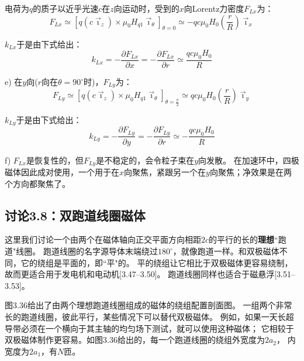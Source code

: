 电荷为$q$的质子以近乎光速$c$在$z$向运动时，受到的$x$向Lorentz力密度$F_{Lx}$为：
\begin{equation}
F_{Lx}\simeq[q(c\vec{\imath}_{z})\times\mu_{0}H_{q1}\vec{\imath}_{\theta}]_{\theta=0}
\simeq-qc\mu_{0}H_{0}\left(\frac{r}{R}\right)\vec{\imath}_{x}\tag{S9.2}%
\end{equation}

$k_{Lx}$于是由下式给出：
\begin{equation}
k_{Lx}=-\frac{\partial F_{Lx}}{\partial x}=-\frac{\partial F_{Lx}}{\partial r}
\simeq \frac{qc\mu_{0}H_{0}}{R}\tag{3.148}%
\end{equation}

e) 在$y$向($r$向在$\theta=90^\circ$时)，$F_{Ly}$为：
\begin{equation}
F_{Ly}\simeq[q(c\vec{\imath}_{z})\times\mu_{0}H_{q1}\vec{\imath}_{\theta}]_{\theta=\frac{\pi}{2}}
\simeq qc\mu_{0}H_{0}\left(\frac{r}{R}\right)\vec{\imath}_{y}\tag{S9.3}%
\end{equation}

$k_{Ly}$于是由下式给出：
\begin{equation}
k_{Ly}=-\frac{\partial F_{Ly}}{\partial y}=-\frac{\partial F_{Ly}}{\partial r}
\simeq-\frac{qc \mu_{0}H_{0}}{R}\tag{3.149}%
\end{equation}

f) $F_{Lx}$是恢复性的，但$F_{Ly}$是不稳定的，会令粒子束在$y$向发散。
在加速环中，四极磁体因此成对使用，一个用于在$x$向聚焦，紧跟另一个在$y$向聚焦；净效果是在两个方向都聚焦了。




\subsection{讨论3.8：双跑道线圈磁体}
这里我们讨论一个由两个在磁体轴向正交平面方向相距$2c$的平行的长的\textbf{理想}``跑道"线圈。
跑道线圈的名字源导体末端绕过$180^\circ$，就像跑道一样。和双极磁体不同，它的绕组是平面的，即``平"的。
平的绕组让它相比于双极磁体更容易绕制，故而更适合用于发电机和电动机[3.47–3.50]。
跑道线圈同样也适合于磁悬浮[3.51–3.53]。

图3.36给出了由两个理想跑道线圈组成的磁体的绕组配置剖面图。
一组两个非常长的跑道线圈，彼此平行，某些情况下可以替代双极磁体。
例如，如果一天长超导带必须在一个横向于其主轴的均匀场下测试，就可以使用这种磁体；
它相较于双极磁体制作更容易。如图3.36给出的，每一个跑道线圈的绕组外宽度为$2a_2$，
内宽度为$2a_1$，有$N$匝。

